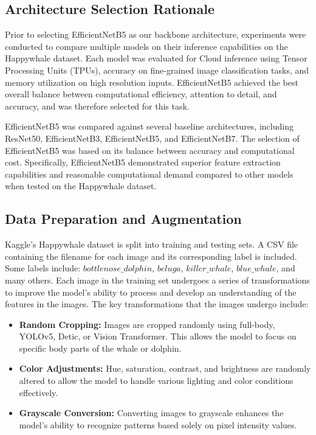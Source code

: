 \documentclass[twocolumn]{article}
\begin{document}
\subsection{Architecture Selection Rationale}

Prior to selecting EfficientNetB5 as our backbone architecture, experiments were conducted to compare multiple models on their inference capabilities on the Happywhale dataset. Each model was evaluated for Cloud inference using Tensor Processing Units (TPUs), accuracy on fine-grained image classification tasks, and memory utilization on high resolution inputs. EfficientNetB5 achieved the best overall balance between computational efficiency, attention to detail, and accuracy, and was therefore selected for this task.

EfficientNetB5 was compared against several baseline architectures, including ResNet50, EfficientNetB3, EfficientNetB5, and EfficientNetB7. The selection of EfficientNetB5 was based on its balance between accuracy and computational cost. Specifically, EfficientNetB5 demonstrated superior feature extraction capabilities and reasonable computational demand compared to other models when tested on the Happywhale dataset.

\subsection{Data Preparation and Augmentation}

Kaggle’s Happywhale dataset is split into training and testing sets. A CSV file containing the filename for each image and its corresponding label is included. Some labels include: \(bottlenose\_dolphin\), \(beluga\), \(killer\_whale\), \(blue\_whale\), and many others. Each image in the training set undergoes a series of transformations to improve the model’s ability to process and develop an understanding of the features in the images. The key transformations that the images undergo include:

\begin{itemize}
    \item \textbf{Random Cropping:} Images are cropped randomly using full-body, YOLOv5, Detic, or Vision Transformer. This allows the model to focus on specific body parts of the whale or dolphin.
    \item \textbf{Color Adjustments:} Hue, saturation, contrast, and brightness are randomly altered to allow the model to handle various lighting and color conditions effectively.
    \item \textbf{Grayscale Conversion:} Converting images to grayscale enhances the model’s ability to recognize patterns based solely on pixel intensity values. 
\end{itemize}
\end{document}
